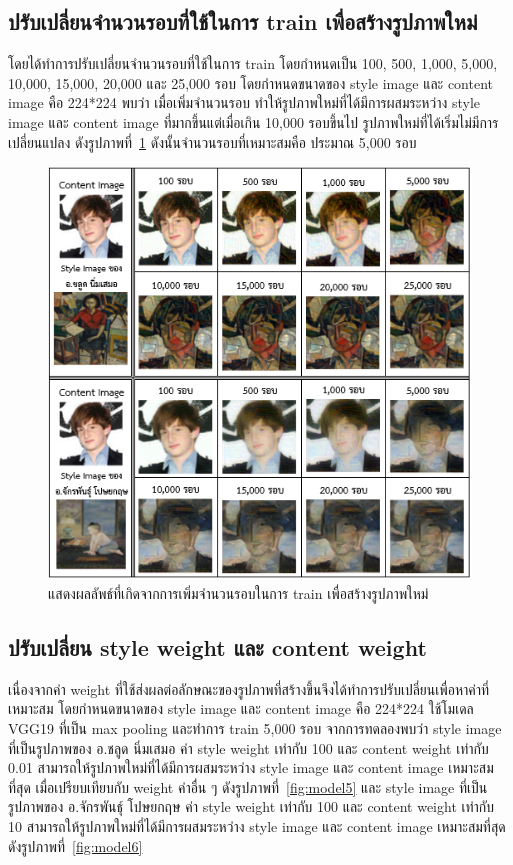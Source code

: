 \documentclass[12pt,oneside,openright,a4paper]{cpe-thai-project}
\begin{document}
\pagebreak
\subsection{ปรับเปลี่ยนจำนวนรอบที่ใช้ในการ train เพื่อสร้างรูปภาพใหม่}
โดยได้ทำการปรับเปลี่ยนจำนวนรอบที่ใช้ในการ train โดยกำหนดเป็น 100, 500, 1,000, 5,000, 10,000, 15,000, 20,000 และ 25,000 รอบ โดยกำหนดขนาดของ style image และ content image คือ 224*224 พบว่า เมื่อเพิ่มจำนวนรอบ ทำให้รูปภาพใหม่ที่ได้มีการผสมระหว่าง style image และ content image ที่มากขึ้นแต่เมื่อเกิน 10,000 รอบขึ้นไป รูปภาพใหม่ที่ได้เริ่มไม่มีการเปลี่ยนแปลง ดังรูปภาพที่~\ref{fig:model4} ดังนั้นจำนวนรอบที่เหมาะสมคือ ประมาณ 5,000 รอบ

\begin{figure}[!h]
  \centering
  \includegraphics[width=12cm]{./image/model4.png}
  \caption{แสดงผลลัพธ์ที่เกิดจากการเพิ่มจำนวนรอบในการ train เพื่อสร้างรูปภาพใหม่}
  \label{fig:model4}
\end{figure}

\subsection{ปรับเปลี่ยน style weight และ content weight}
เนื่องจากค่า weight ที่ใช้ส่งผลต่อลักษณะของรูปภาพที่สร้างขึ้นจึงได้ทำการปรับเปลี่ยนเพื่อหาค่าที่เหมาะสม โดยกำหนดขนาดของ style image และ content image คือ 224*224 ใช้โมเดล VGG19 ที่เป็น max pooling และทำการ train 5,000 รอบ จากการทดลองพบว่า style image ที่เป็นรูปภาพของ อ.ชลูด นิ่มเสมอ ค่า style weight เท่ากับ 100 และ content weight เท่ากับ 0.01 สามารถให้รูปภาพใหม่ที่ได้มีการผสมระหว่าง style image และ content image เหมาะสมที่สุด เมื่อเปรียบเทียบกับ weight ค่าอื่น ๆ ดังรูปภาพที่~\ref{fig:model5} และ style image ที่เป็นรูปภาพของ อ.จักรพันธุ์ โปษยกฤษ ค่า style weight เท่ากับ 100 และ content weight เท่ากับ 10 สามารถให้รูปภาพใหม่ที่ได้มีการผสมระหว่าง style image และ content image เหมาะสมที่สุด ดังรูปภาพที่~\ref{fig:model6}
\end{document}
